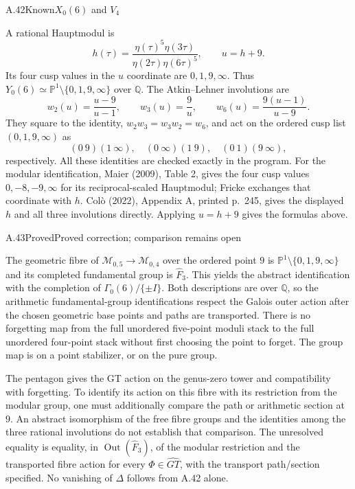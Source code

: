 \begin{statement}{A.42}{Known}{$X_0(6)$ and $V_4$}
\citep{Maier2009,Colo2022}
\end{statement}
A rational Hauptmodul is
\[
 h(\tau)=\frac{\eta(\tau)^5\eta(3\tau)}
 {\eta(2\tau)\eta(6\tau)^5},\qquad u=h+9.
\]
Its four cusp values in the $u$ coordinate are $0,1,9,\infty$.
Thus $Y_0(6)\simeq\mathbb P^1\setminus\{0,1,9,\infty\}$ over
$\mathbb Q$. The Atkin--Lehner involutions are
\[
 w_2(u)=\frac{u-9}{u-1},\qquad
 w_3(u)=\frac9u,\qquad
 w_6(u)=\frac{9(u-1)}{u-9}.
\]
They square to the identity, $w_2w_3=w_3w_2=w_6$, and act on the ordered
cusp list $(0,1,9,\infty)$ as
\[
 (0\ 9)(1\ \infty),\quad (0\ \infty)(1\ 9),\quad
 (0\ 1)(9\ \infty),
\]
respectively. All these identities are checked exactly in the program.
For the modular identification, Maier (2009), Table 2, gives the four
cusp values $0,-8,-9,\infty$ for its reciprocal-scaled Hauptmodul;
Fricke exchanges that coordinate with $h$. Col\`o (2022), Appendix A,
printed p.~245, gives the displayed $h$ and all three involutions directly.
Applying $u=h+9$ gives the formulas above.

\begin{statement}{A.43}{Proved}{Proved correction; comparison remains open}
\end{statement}
The geometric fibre of
$\mathcal M_{0,5}\to\mathcal M_{0,4}$ over the ordered point $9$ is
$\mathbb P^1\setminus\{0,1,9,\infty\}$ and its completed fundamental
group is $\widehat F_3$. This yields the abstract identification with the
completion of $\Gamma_0(6)/\{\pm I\}$. Both descriptions are over
$\mathbb Q$, so the arithmetic fundamental-group identifications respect
the Galois outer action after the chosen geometric base points and paths
are transported. There is no forgetting map from the full unordered
five-point moduli stack to the full unordered four-point stack without
first choosing the point to forget. The group map is on a point stabilizer,
or on the pure group.

The pentagon gives the GT action on the genus-zero tower and compatibility
with forgetting. To identify its action on this fibre with its restriction
from the modular group, one must additionally compare the path or
arithmetic section at $9$. An abstract isomorphism of the free fibre groups
and the identities among the three rational involutions do not establish
that comparison. The unresolved equality is equality, in
$\operatorname{Out}(\widehat F_3)$, of the modular restriction and the
transported fibre action for every $\Phi\in\widehat{GT}$, with the
transport path/section specified. No vanishing of $\Delta$ follows from
A.42 alone.

